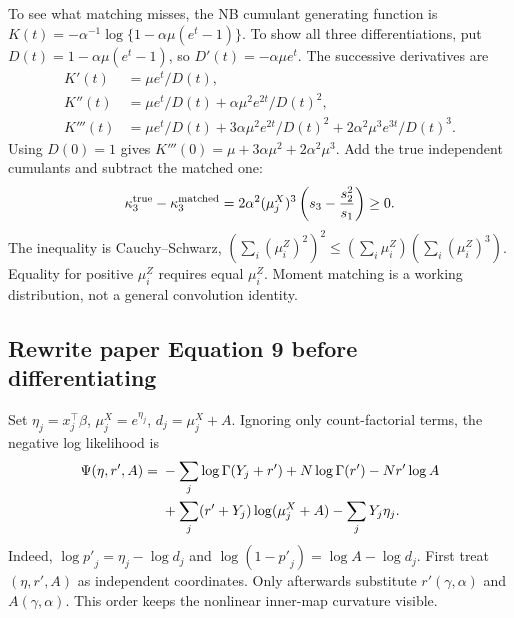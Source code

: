 \documentclass[11pt,a4paper]{article}
\numberwithin{equation}{section}
\begin{document}
To see what matching misses, the NB cumulant generating function is
$K(t)=-\alpha^{-1}\log\{1-\alpha\mu(e^t-1)\}$.
To show all three differentiations, put
$D(t)=1-\alpha\mu(e^t-1)$, so $D'(t)=-\alpha\mu e^t$.
The successive derivatives are
\begin{align}
 K'(t)&=\mu e^t/D(t),\\
 K''(t)&=\mu e^t/D(t)+\alpha\mu^2e^{2t}/D(t)^2,\\
 K'''(t)&=\mu e^t/D(t)+3\alpha\mu^2e^{2t}/D(t)^2
                      +2\alpha^2\mu^3e^{3t}/D(t)^3.
\end{align}
Using $D(0)=1$ gives
$K'''(0)=\mu+3\alpha\mu^2+2\alpha^2\mu^3$.
Add the true independent cumulants and subtract the matched one:
\begin{equation}
 \kappa_3^{\rm true}-\kappa_3^{\rm matched}
 =2\alpha^2(\mu_j^X)^3\left(s_3-\frac{s_2^2}{s_1}\right)\geq0.
 \label{eq:third-cumulant}
\end{equation}
The inequality is Cauchy--Schwarz,
$(\sum_i(\mu_i^Z)^2)^2\leq(\sum_i\mu_i^Z)(\sum_i(\mu_i^Z)^3)$.
Equality for positive $\mu_i^Z$ requires equal $\mu_i^Z$.
Moment matching is a working distribution, not a general convolution identity.

\subsection{Rewrite paper Equation 9 before differentiating}
Set $\eta_j=x_j^\top\beta$, $\mu_j^X=e^{\eta_j}$, $d_j=\mu_j^X+A$.
Ignoring only count-factorial terms, the negative log likelihood is
\begin{align}
 \Psi(\eta,{r'},A)
 ={}&-\sum_j\log\Gamma(Y_j+{r'})+N\log\Gamma({r'})-N{r'}\log A
 \notag\\
 &+\sum_j({r'}+Y_j)\log(\mu_j^X+A)-\sum_jY_j\eta_j .
 \label{eq:Psi}
\end{align}
Indeed, $\log {p'}_j=\eta_j-\log d_j$ and
$\log(1-{p'}_j)=\log A-\log d_j$.
First treat $(\eta,{r'},A)$ as independent coordinates.
Only afterwards substitute ${r'}(\gamma,\alpha)$ and $A(\gamma,\alpha)$.
This order keeps the nonlinear inner-map curvature visible.
\end{document}
